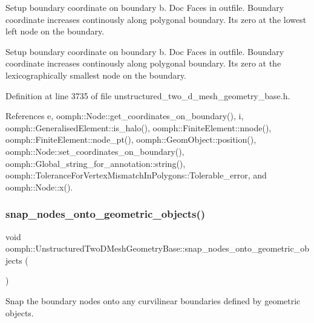 Setup boundary coordinate on boundary b. Doc Faces in outfile. Boundary coordinate increases continously along polygonal boundary. It\textquotesingle{}s zero at the lowest left node on the boundary. 

Setup boundary coordinate on boundary b. Doc Faces in outfile. Boundary coordinate increases continously along polygonal boundary. It\textquotesingle{}s zero at the lexicographically smallest node on the boundary. 

Definition at line 3735 of file unstructured\+\_\+two\+\_\+d\+\_\+mesh\+\_\+geometry\+\_\+base.\+h.



References e, oomph\+::\+Node\+::get\+\_\+coordinates\+\_\+on\+\_\+boundary(), i, oomph\+::\+Generalised\+Element\+::is\+\_\+halo(), oomph\+::\+Finite\+Element\+::nnode(), oomph\+::\+Finite\+Element\+::node\+\_\+pt(), oomph\+::\+Geom\+Object\+::position(), oomph\+::\+Node\+::set\+\_\+coordinates\+\_\+on\+\_\+boundary(), oomph\+::\+Global\+\_\+string\+\_\+for\+\_\+annotation\+::string(), oomph\+::\+Tolerance\+For\+Vertex\+Mismatch\+In\+Polygons\+::\+Tolerable\+\_\+error, and oomph\+::\+Node\+::x().

\mbox{\label{classoomph_1_1UnstructuredTwoDMeshGeometryBase_a569174a8d7d51bd5ef8f468a625c7316}} 
\subsubsection{\texorpdfstring{snap\+\_\+nodes\+\_\+onto\+\_\+geometric\+\_\+objects()}{snap\_nodes\_onto\_geometric\_objects()}}
{\footnotesize\ttfamily void oomph\+::\+Unstructured\+Two\+D\+Mesh\+Geometry\+Base\+::snap\+\_\+nodes\+\_\+onto\+\_\+geometric\+\_\+objects (\begin{DoxyParamCaption}{ }\end{DoxyParamCaption})\hspace{0.3cm}{\ttfamily [protected]}}



Snap the boundary nodes onto any curvilinear boundaries defined by geometric objects. 

